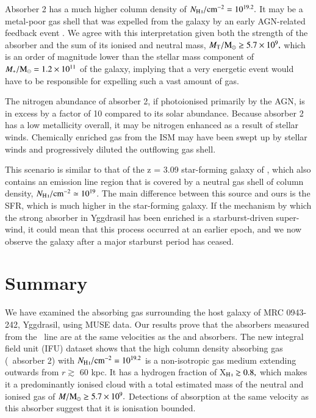 Absorber 2 has a much higher  column density of $N_\ion{H}{I}/{\rm cm}^{-2} = 10^{19.2}.$ It may be a metal-poor gas shell that was expelled from the galaxy by an early AGN-related feedback event \citep{jarvis2003,binette2006}. We agree with this interpretation given both the strength of the absorber and the sum of its ionised and neutral mass, $M_{\rm T}/\rm{M}_\odot \geq 5.7\times 10^{9},$ which is an order of magnitude lower than the stellar mass component of $M_*/\rm{M}_\odot = 1.2\times 10^{11}$ of the galaxy, implying that a very energetic event would have to be responsible for expelling such a vast amount of gas. 

The nitrogen abundance of absorber 2, if photoionised primarily by the AGN, is in excess by a factor of 10 compared to its solar abundance. Because absorber 2 has a low metallicity overall, it may be nitrogen enhanced as a result of stellar winds. Chemically enriched gas from the ISM may have been swept up by stellar winds and progressively diluted the outflowing gas shell. 

This scenario is similar to that of the z = 3.09 star-forming galaxy of \citet{wilman2005}, which also contains an emission line region that is covered by a neutral gas shell of  column density, $N_\ion{H}{I}/{\rm cm}^{-2} \simeq 10^{19}$. The main difference between this source and ours is the SFR, which is much higher in the star-forming galaxy. If the mechanism by which the strong absorber in Yggdrasil has been enriched is a starburst-driven super-wind, it could mean that this process occurred at an earlier epoch, and we now observe the galaxy after a major starburst period has ceased. 

\section{Summary}\label{section:summary}


We have examined the absorbing gas surrounding the host galaxy of  MRC 0943-242, Yggdrasil, using MUSE data. Our results prove that the  absorbers measured from the \lya~line are at the same velocities as the  and  absorbers. The new integral field unit (IFU) dataset shows that the high  column density absorbing gas (\lya~absorber 2) with $N_\ion{H}{I}/{\rm cm}^{-2} = 10^{19.2}$  is a non-isotropic gas medium extending outwards from $r \gtrsim$ 60 kpc. It has a hydrogen fraction of X$_\ion{H}{I} \gtrsim 0.8,$ which makes it a predominantly ionised cloud with a total estimated mass of the neutral and  ionised gas of $M/\rm{M}_\odot \geq 5.7\times 10^{9}.$ Detections of  absorption at the same velocity as this absorber suggest that it is ionisation bounded.

